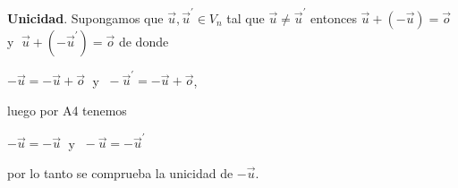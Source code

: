 \begin{enumerate}
    \textbf{Unicidad}. Supongamos que $\vec{u},\vec{u}^{'} \in V_n$ tal que $\vec{u}\neq \vec{u}^{'}$ entonces $\vec{u}+(-\vec{u}) = \vec{o}\; $ y $\; \vec{u}+(-\vec{u}^{'}) = \vec{o}$ de donde \begin{center} $-\vec{u} = -\vec{u} + \vec{o}\; $ y $\; -\vec{u}^{'} = -\vec{u} + \vec{o}$,\end{center} luego por A4 tenemos \begin{center} $-\vec{u} = -\vec{u}\;$ y $\; -\vec{u} = -\vec{u}^{'}$ \end{center}
    por lo tanto se comprueba la unicidad de $-\vec{u}$.\\\\ 

\begin{comment}

\item [\large\bfseries M1] $\forall\; \vec{u} \in V_n:\;  1\cdot \vec{u} = \vec{u}$\\\\
    Demostración.-\; Sea $\vec{u} = (u_1,u_2,...,u_n)$, entonces $1\cdot \vec{u} = 1\cdot (u_1,u_2,...,u_n)$, luego por D3 se tiene, $$(1\cdot u_1,1\cdot u_2,...,1\cdot u_n)$$
    luego por existencia de una identidad para la multiplicación en $\mathbb{R}$ obtenemos $(u_1,u_2,...,u_n)$ de donde concluimos $$1\cdot \vec{u} = \vec{u}.$$

\item [\large\bfseries M3] $\forall\; r,s \in \mathbb{R}, \; \forall\; \vec{u} \in V_n:\; r(s \vec{u}) = (rs)\vec{u}$\\\\
    Demostración.-\; Sea $r,s \in \mathbb{R}$ y $\vec{u}\in V_n$ entonces 
	\begin{center}
	    \begin{tabular}{rcll}
		$r(s\vec{u})$&$=$&$r(sa_1,sa_2,...,sa_n)$&D3\\
		&$=$&$\left[(cd)a_1,(rs)a_2,...,(rs)a_3\right]$&D3\\
		&$=$&$(rs)A$&\\
	    \end{tabular}
	\end{center}
	por lo tanto $r(s\vec{u} = (rs)\vec{u}$.\\\\


\end{comment}
\end{enumerate}
